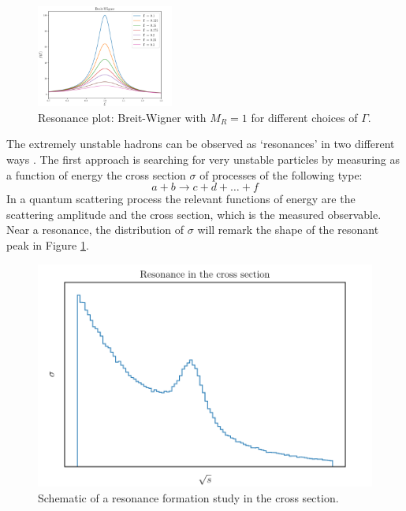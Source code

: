 \begin{figure}[H]
	\begin{center}
		\includegraphics[width=0.4\textwidth]{Python/LHC/bw.pdf}
		\caption{Resonance plot: Breit-Wigner with $M_{R}=1$ for different choices of $\Gamma$.}
		\label{fig:RESONANCE_PLOT}
	\end{center}
\end{figure}

The extremely unstable hadrons can be observed as `resonances' in two different ways \cite{bettini}. The first approach is searching for very unstable particles by measuring as a function of energy the cross section $\sigma$ of processes of the following type:
\begin{equation}
	a + b \longrightarrow c + d + \dots + f
\end{equation}
In a quantum scattering process the relevant functions of energy are the scattering amplitude and the cross section, which is the measured observable. Near a resonance, the distribution of $\sigma$ will remark the shape of the resonant peak in Figure \ref{fig:RESONANCE_PLOT}.


\begin{figure}[H]
\centering%
\begin{minipage}{0.4\textwidth}
	\centering
	
\end{minipage}
%
\begin{minipage}{0.4\textwidth}\centering
	\includegraphics[width=1.0\linewidth]{Python/LHC/RES/res1.pdf}
\end{minipage}%

\caption{Schematic of a resonance formation study in the cross section.}
\label{fig:CROSS_SECTION_RESONANCE}
\end{figure}


